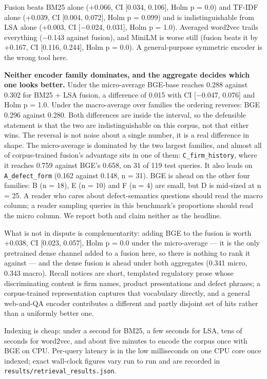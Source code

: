 \documentclass[acmsmall]{acmart}
\begin{document}
Fusion beats BM25 alone (+0.066, CI [0.034, 0.106], Holm p = 0.0) and TF-IDF alone (+0.039, CI [0.004, 0.072], Holm p = 0.099) and is indistinguishable from LSA alone (+0.003, CI [$-$0.024, 0.031], Holm p = 1.0). Averaged word2vec trails everything ($-$0.143 against fusion), and MiniLM is worse still (fusion beats it by +0.167, CI [0.116, 0.244], Holm p = 0.0). A general-purpose symmetric encoder is the wrong tool here.

\textbf{Neither encoder family dominates, and the aggregate decides which one looks better.} Under the micro-average BGE-base reaches 0.288 against 0.302 for BM25 + LSA fusion, a difference of 0.015 with CI [$-$0.047, 0.076] and Holm p = 1.0. Under the macro-average over families the ordering reverses: BGE 0.296 against 0.280. Both differences are inside the interval, so the defensible statement is that the two are indistinguishable on this corpus, not that either wins. The reversal is not noise about a single number, it is a real difference in shape. The micro-average is dominated by the two largest families, and almost all of corpus-trained fusion's advantage sits in one of them: \texttt{C\_firm\_history}, where it reaches 0.759 against BGE's 0.658, on 31 of 119 test queries. It also leads on \texttt{A\_defect\_form} (0.162 against 0.148, n = 31). BGE is ahead on the other four families: B (n = 18), E (n = 10) and F (n = 4) are small, but D is mid-sized at n = 25. A reader who cares about defect-semantics questions should read the macro column; a reader sampling queries in this benchmark's proportions should read the micro column. We report both and claim neither as the headline.

What is not in dispute is complementarity: adding BGE to the fusion is worth +0.038, CI [0.023, 0.057], Holm p = 0.0 under the micro-average --- it is the only pretrained dense channel added to a fusion here, so there is nothing to rank it against --- and the dense fusion is ahead under both aggregates (0.341 micro, 0.343 macro). Recall notices are short, templated regulatory prose whose discriminating content is firm names, product presentations and defect phrases; a corpus-trained representation captures that vocabulary directly, and a general web-and-QA encoder contributes a different and partly disjoint set of hits rather than a uniformly better one.

Indexing is cheap: under a second for BM25, a few seconds for LSA, tens of seconds for word2vec, and about five minutes to encode the corpus once with BGE on CPU. Per-query latency is in the low milliseconds on one CPU core once indexed; exact wall-clock figures vary run to run and are recorded in \texttt{results/retrieval\_\allowbreak{}results.json}.
\end{document}
